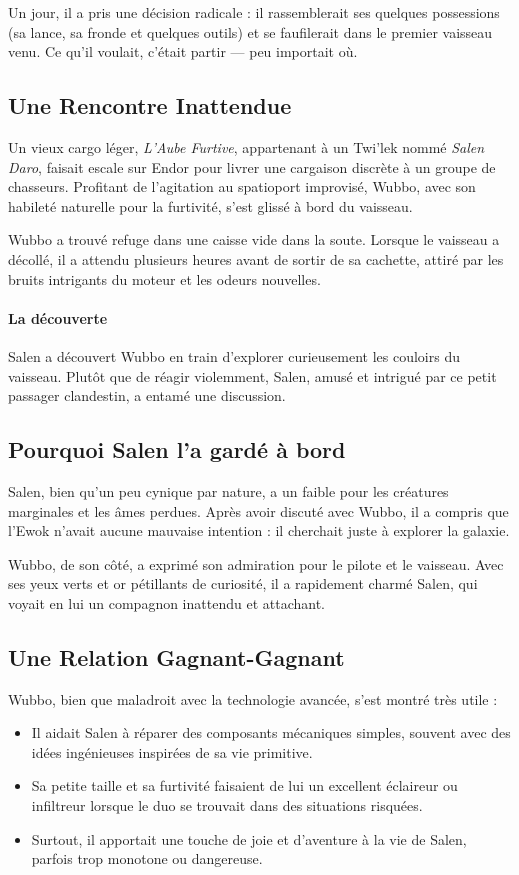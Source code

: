 \documentclass[a4paper,9pt,twoside,twocolumn,openany]{book}
\begin{document}
Un jour, il a pris une décision radicale : il rassemblerait ses quelques possessions (sa lance, sa fronde et quelques outils) et se faufilerait dans le premier vaisseau venu. Ce qu’il voulait, c’était partir — peu importait où.

\subsection{Une Rencontre Inattendue}
Un vieux cargo léger, \emph{L’Aube Furtive}, appartenant à un Twi’lek nommé \emph{Salen Daro}, faisait escale sur Endor pour livrer une cargaison discrète à un groupe de chasseurs. Profitant de l’agitation au spatioport improvisé, Wubbo, avec son habileté naturelle pour la furtivité, s’est glissé à bord du vaisseau.

Wubbo a trouvé refuge dans une caisse vide dans la soute. Lorsque le vaisseau a décollé, il a attendu plusieurs heures avant de sortir de sa cachette, attiré par les bruits intrigants du moteur et les odeurs nouvelles.

\paragraph{La découverte} Salen a découvert Wubbo en train d'explorer curieusement les couloirs du vaisseau. Plutôt que de réagir violemment, Salen, amusé et intrigué par ce petit passager clandestin, a entamé une discussion.

\subsection{Pourquoi Salen l’a gardé à bord}
Salen, bien qu’un peu cynique par nature, a un faible pour les créatures marginales et les âmes perdues. Après avoir discuté avec Wubbo, il a compris que l’Ewok n’avait aucune mauvaise intention : il cherchait juste à explorer la galaxie.

Wubbo, de son côté, a exprimé son admiration pour le pilote et le vaisseau. Avec ses yeux verts et or pétillants de curiosité, il a rapidement charmé Salen, qui voyait en lui un compagnon inattendu et attachant.

\subsection{Une Relation Gagnant-Gagnant}
Wubbo, bien que maladroit avec la technologie avancée, s’est montré très utile :
\begin{itemize}
    \item Il aidait Salen à réparer des composants mécaniques simples, souvent avec des idées ingénieuses inspirées de sa vie primitive.
    \item Sa petite taille et sa furtivité faisaient de lui un excellent éclaireur ou infiltreur lorsque le duo se trouvait dans des situations risquées.
    \item Surtout, il apportait une touche de joie et d’aventure à la vie de Salen, parfois trop monotone ou dangereuse.
\end{itemize}
\end{document}
